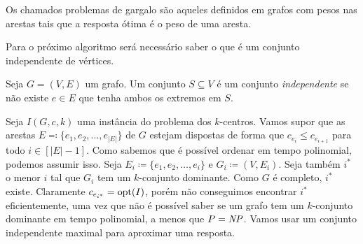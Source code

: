 Os chamados problemas de gargalo são aqueles definidos em grafos com pesos nas arestas tais que a resposta ótima é o peso de uma aresta.

Para o próximo algoritmo será necessário saber o que é um conjunto independente de vértices.
\begin{definition}
    Seja $G = (V,E)$ um grafo. Um conjunto $S \subseteq V$ é um conjunto \emph{independente} se não existe $e \in E$ que tenha ambos os extremos em $S$.
\end{definition}
Seja $I(G,c,k)$ uma instância do problema dos $k$-centros. Vamos supor que as arestas $E \eqqcolon \{e_1,e_2,\ldots,e_{|E|}\}$ de $G$ estejam dispostas de forma que $c_{e_i} \leq c_{e_{i+1}}$ para todo $i \in [|E|-1]$. Como sabemos que é possível ordenar em tempo polinomial, podemos assumir isso.
Seja $E_i \coloneqq \{e_1,e_2,\ldots,e_i\}$ e $G_i \coloneqq (V,E_i)$. Seja também $i^*$ o menor $i$ tal que $G_i$ tem um $k$-conjunto dominante. Como $G$ é completo, $i^*$ existe. Claramente $c_{e_{i^*}} = \mathrm{opt}(I)$, porém não conseguimos encontrar $i^*$ eficientemente, uma vez que não é possível saber se um grafo tem um $k$-conjunto dominante em tempo polinomial, a menos que $P = \mathit{NP}$. Vamos usar um conjunto independente maximal para aproximar uma resposta.


